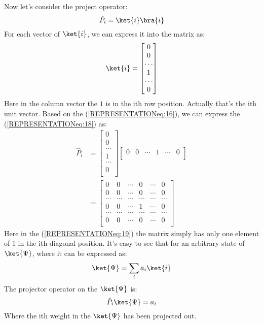 Now let's consider the project operator:
\begin{equation}\label{REPRESENTATIONeq:18}
\hat{P}_{i} = \ket{i}\bra{i}
\end{equation}
For each vector of $\ket{i}$, we can express it into the matrix as:
\begin{equation}\label{REPRESENTATIONeq:16}
\ket{i} = \begin{bmatrix}
            0 \\
            0 \\
            \cdots \\
            1 \\
            \cdots \\
            0 \\
          \end{bmatrix}
\end{equation}
Here in the column vector the $1$ is in the ith row position.
Actually that's the ith unit vector. Based on the
(\ref{REPRESENTATIONeq:16}), we can express the
(\ref{REPRESENTATIONeq:18}) as:
\begin{align}\label{REPRESENTATIONeq:19}
\hat{P}_{i} &=
\begin{bmatrix}
0 \\
0 \\
\cdots \\
1 \\
\cdots \\
0 \\
\end{bmatrix}
\begin{bmatrix}
  0 & 0 & \cdots & 1 & \cdots & 0 \\
\end{bmatrix} \nonumber \\
&=
\begin{bmatrix}
  0      & 0      & \cdots & 0      & \cdots & 0    \\
  0      & 0      & \cdots & 0      & \cdots & 0     \\
  \cdots & \cdots & \cdots & \cdots & \cdots & \cdots \\
  0      & 0      & \cdots & 1      & \cdots & 0      \\
  \cdots & \cdots & \cdots & \cdots & \cdots & \cdots \\
  0      & 0      & \cdots & 0      & \cdots & 0      \\
\end{bmatrix}
\end{align}
Here in the (\ref{REPRESENTATIONeq:19}) the matrix simply has only
one element of $1$ in the ith diagonal position. It's easy to see
that for an arbitrary state of $\ket{\Psi}$, where it can be
expressed as:
\begin{equation}\label{}
\ket{\Psi} = \sum_{i}a_{i}\ket{i}
\end{equation}
The projector operator on the $\ket{\Psi}$ is:
\begin{equation}\label{}
\hat{P}_{i}\ket{\Psi} = a_{i}
\end{equation}
Where the ith weight in the $\ket{\Psi}$ has been projected out.

